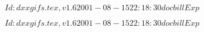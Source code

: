 \documentclass{article}
\begin{document}
$Id: dxxgifs.tex,v 1.6 2001-08-15 22:18:30 docbill Exp $


\pagebreak


$Id: dxxgifs.tex,v 1.6 2001-08-15 22:18:30 docbill Exp $


\pagebreak
\end{document}
